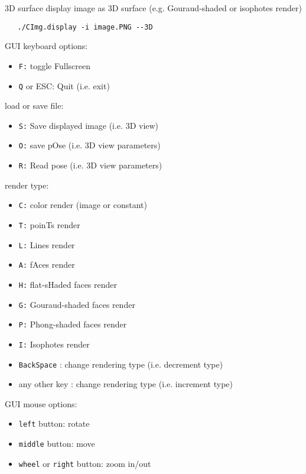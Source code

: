 \begin{Desc}
\item[3D surface]display image as 3D surface (e.g. Gouraud-shaded or isophotes render) 

\begin{Code}\begin{verbatim}   ./CImg.display -i image.PNG --3D
\end{verbatim}
\end{Code}

 GUI keyboard options: \begin{itemize}
\item {\tt F:} toggle Fullscreen \item {\tt Q} or ESC: Quit (i.e. exit)\end{itemize}
load or save file: \begin{itemize}
\item {\tt S:} Save displayed image (i.e. 3D view) \item {\tt O:} save pOse (i.e. 3D view parameters) \item {\tt R:} Read pose (i.e. 3D view parameters)\end{itemize}
render type: \begin{itemize}
\item {\tt C:} color render (image or constant) \item {\tt T:} poinTs render \item {\tt L:} Lines render \item {\tt A:} fAces render \item {\tt H:} flat-sHaded faces render \item {\tt G:} Gouraud-shaded faces render \item {\tt P:} Phong-shaded faces render \item {\tt I:} Isophotes render \item {\tt BackSpace} : change rendering type (i.e. decrement type) \item any other key : change rendering type (i.e. increment type)\end{itemize}
GUI mouse options: \begin{itemize}
\item {\tt left} button: rotate \item {\tt middle} button: move \item {\tt wheel} or {\tt right} button: zoom in/out  \end{itemize}
\end{Desc}
